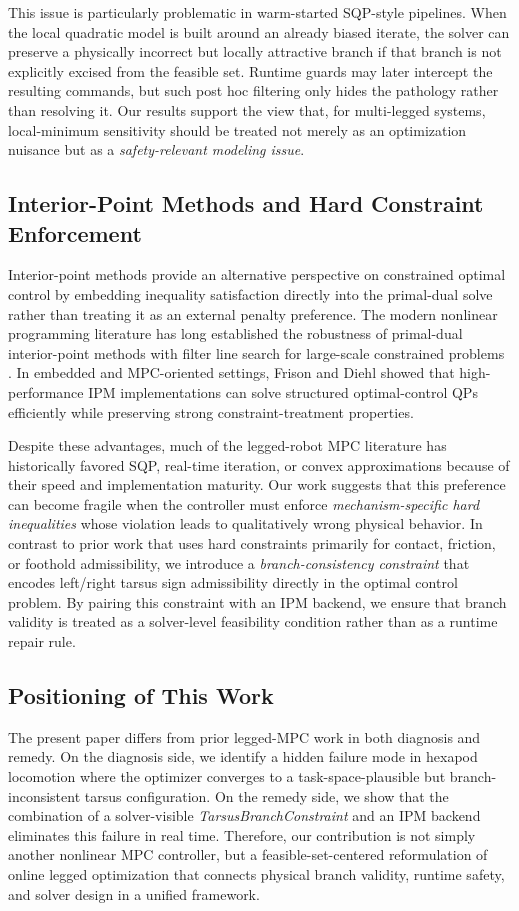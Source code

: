 This issue is particularly problematic in warm-started SQP-style pipelines. When the local quadratic model is built around an already biased iterate, the solver can preserve a physically incorrect but locally attractive branch if that branch is not explicitly excised from the feasible set. Runtime guards may later intercept the resulting commands, but such post hoc filtering only hides the pathology rather than resolving it. Our results support the view that, for multi-legged systems, local-minimum sensitivity should be treated not merely as an optimization nuisance but as a \emph{safety-relevant modeling issue}.

\subsection{Interior-Point Methods and Hard Constraint Enforcement}

Interior-point methods provide an alternative perspective on constrained optimal control by embedding inequality satisfaction directly into the primal-dual solve rather than treating it as an external penalty preference. The modern nonlinear programming literature has long established the robustness of primal-dual interior-point methods with filter line search for large-scale constrained problems \cite{wachter2006ipopt}. In embedded and MPC-oriented settings, Frison and Diehl \cite{frison2020hpipm} showed that high-performance IPM implementations can solve structured optimal-control QPs efficiently while preserving strong constraint-treatment properties.

Despite these advantages, much of the legged-robot MPC literature has historically favored SQP, real-time iteration, or convex approximations because of their speed and implementation maturity. Our work suggests that this preference can become fragile when the controller must enforce \emph{mechanism-specific hard inequalities} whose violation leads to qualitatively wrong physical behavior. In contrast to prior work that uses hard constraints primarily for contact, friction, or foothold admissibility, we introduce a \emph{branch-consistency constraint} that encodes left/right tarsus sign admissibility directly in the optimal control problem. By pairing this constraint with an IPM backend, we ensure that branch validity is treated as a solver-level feasibility condition rather than as a runtime repair rule.

\subsection{Positioning of This Work}

The present paper differs from prior legged-MPC work in both diagnosis and remedy. On the diagnosis side, we identify a hidden failure mode in hexapod locomotion where the optimizer converges to a task-space-plausible but branch-inconsistent tarsus configuration. On the remedy side, we show that the combination of a solver-visible \emph{TarsusBranchConstraint} and an IPM backend eliminates this failure in real time. Therefore, our contribution is not simply another nonlinear MPC controller, but a feasible-set-centered reformulation of online legged optimization that connects physical branch validity, runtime safety, and solver design in a unified framework.
